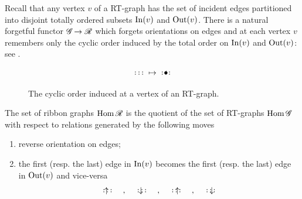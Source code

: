Recall that any vertex $v$ of a RT-graph has the set of incident edges
partitioned into disjoint totally ordered subsets $\operatorname{In}(v)$ and
$\operatorname{Out}(v)$.  There is a natural forgetful functor $\mathscr{G}_{}\to\mathscr{R}_{}$ which
forgets orientations on edges and at each vertex $v$ remembers only
the cyclic order induced by the total order on $\operatorname{In}(v)$ and $\operatorname{Out}(v)$:
see .
\begin{figure}
  \begin{equation*}
    {%
      \xy*!LC\xybox{
        (0,1)*+[F]{\ };%
        (-1,0)**\dir{-},(-0.5,0)**\dir{-},%
        (0,0.5)*+{\ldots},(1,0)**\dir{-},%
        (-1,2)**\dir{-},(-0.5,2)**\dir{-},%
        (0,1.5)*+{\ldots},(1,2)**\dir{-},%
        }\endxy\mapsto
      \xy*!LC\xybox{
        (0,1)*{\bullet};%
        (-1,0)**\dir{-},(-0.5,0)**\dir{-},%
        (0,0.5)*+{\ldots},(1,0)**\dir{-},%
        (-1,2)**\dir{-},(-0.5,2)**\dir{-},%
        (0,1.5)*+{\ldots},(1,2)**\dir{-},%
        ,(0,1.3);(0,1)%
        ,{\ellipse<>{-}},(0.02,1.3)*{\scriptscriptstyle{\langle}}
        }\endxy
      }
  \end{equation*}
  \caption{The cyclic order induced at a vertex of an RT-graph.}
  \label{fig:rt-to-cyclic}
\end{figure}
\begin{lemma}
  The set of ribbon graphs $\operatorname{Hom}\mathscr{R}_{}$ is the quotient of the set of
  RT-graphs $\operatorname{Hom}\mathscr{G}_{}$ with respect to relations generated by the
  following moves
  \begin{enumerate}[(M1)]%
  \item \label{M3} reverse orientation on edges;
  \item \label{M4} the first (resp. the last) edge in $\operatorname{In}(v)$ becomes the
    first (resp. the last) edge in $\operatorname{Out}(v)$ and vice-versa
    \vspace*{4ex}
    \begin{equation*}
      {%
        \xy*!LC\xybox{
          (0,1)*+[F]{\ };%
          (-1,0)**\dir{.},(-0.5,0)**\dir{-},%
          (0,0.5)*+{\ldots},(1,0)**\dir{-},%
          (-1,2)**\dir{-},(-0.5,2)**\dir{-},%
          (0,1.5)*+{\ldots},(1,2)**\dir{-},%
          (-.45,1)*{\uparrow}
          }\endxy\quad,\quad\xy*!LC\xybox{
          (0,1)*+[F]{\ };%
          (-1,0)**\dir{-},(-0.5,0)**\dir{-},%
          (0,0.5)*+{\ldots},(1,0)**\dir{-},%
          (-1,2)**\dir{.},(-0.5,2)**\dir{-},%
          (0,1.5)*+{\ldots},(1,2)**\dir{-},%
          (-.45,1)*{\downarrow}
          }\endxy\quad,\quad
        \xy*!LC\xybox{
          (0,1)*+[F]{\ };%
          (-1,0)**\dir{-},(0.5,0)**\dir{-},%
          (0,0.5)*+{\ldots},(1,0)**\dir{.},%
          (-1,2)**\dir{-},(0.5,2)**\dir{-},%
          (0,1.5)*+{\ldots},(1,2)**\dir{-},%
          (.45,1)*{\uparrow}
          }\endxy\quad,\quad\xy*!LC\xybox{
          (0,1)*+[F]{\ };%
          (-1,0)**\dir{-},(0.5,0)**\dir{-},%
          (0,0.5)*+{\ldots},(1,0)**\dir{-},%
          (-1,2)**\dir{-},(0.5,2)**\dir{-},%
          (0,1.5)*+{\ldots},(1,2)**\dir{.},%
          (.45,1)*{\downarrow}
          }\endxy
        }
    \end{equation*}
  \end{enumerate}
\end{lemma} 

